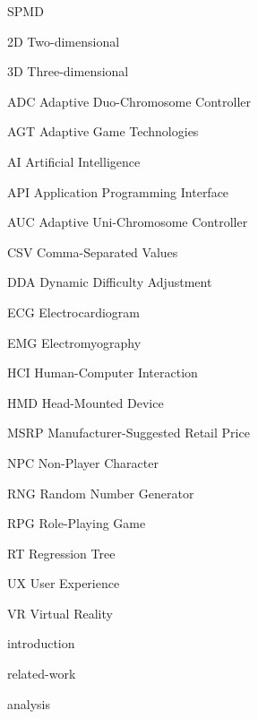 \documentclass[cic,tc,english,nominata]{resources/documentclass/iiufrgs}
\begin{document}
\begin{listofabbrv}{SPMD}
    \item[2D] Two-dimensional
    \item[3D] Three-dimensional
    \item[ADC] Adaptive Duo-Chromosome Controller
	\item[AGT] Adaptive Game Technologies
	\item[AI] Artificial Intelligence
	\item[API] Application Programming Interface
	\item[AUC] Adaptive Uni-Chromosome Controller 
	\item[CSV] Comma-Separated Values 
    \item[DDA] Dynamic Difficulty Adjustment
    \item[ECG] Electrocardiogram
    \item[EMG] Electromyography
    \item[HCI] Human-Computer Interaction
    \item[HMD] Head-Mounted Device
    \item[MSRP] Manufacturer-Suggested Retail Price 
    \item[NPC] Non-Player Character
    \item[RNG] Random Number Generator 
    \item[RPG] Role-Playing Game
    \item[RT] Regression Tree
    \item[UX] User Experience
    \item[VR] Virtual Reality
\end{listofabbrv}


\tableofcontents


{introduction}


{related-work}


{analysis}

\end{document}
